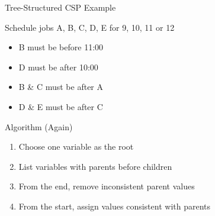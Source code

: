 \documentclass[14pt]{beamer}
\begin{document}
\begin{frame}{Tree-Structured CSP Example}
	\begin{block}{Schedule jobs A, B, C, D, E for 9, 10, 11 or 12}
		\begin{itemize}
			\item B must be before 11:00
			\item D must be after 10:00
			\item B \& C must be after A
			\item D \& E must be after C
		\end{itemize}
	\end{block}
	\begin{block}{Algorithm (Again)}
		\begin{enumerate}
			\item Choose one variable as the root
			\item List variables with parents before children
			\item From the end, remove inconsistent parent values
			\item From the start, assign values consistent with parents
		\end{enumerate}
	\end{block}
\end{frame}
\end{document}
